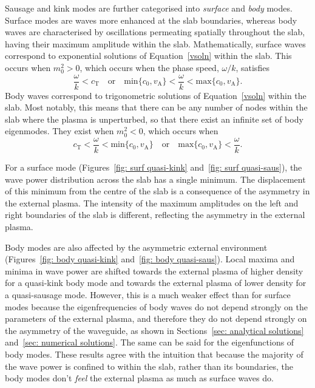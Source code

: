 Sausage and kink modes are further categorised into \textit{surface} and \textit{body} modes. Surface modes are waves more enhanced at the slab boundaries, whereas body waves are characterised by oscillations permeating spatially throughout the slab, having their maximum amplitude within the slab. Mathematically, surface waves correspond to exponential solutions of Equation~\eqref{vsoln} within the slab. This occurs when $m_0^2 > 0$, which occurs when the phase speed, $\omega/k$, satisfies
\begin{equation}
\frac{\omega}{k}<c_\textrm{T} \quad \text{or} \quad \text{min}\{c_0, v_\textrm{A}\}<\frac{\omega}{k}<\text{max}\{c_0, v_\textrm{A}\}.
\end{equation}
Body waves correspond to trigonometric solutions of Equation~\eqref{vsoln} within the slab. Most notably, this means that there can be any number of nodes within the slab where the plasma is unperturbed, so that there exist an infinite set of body eigenmodes. They exist when $m_0^2 < 0$, which occurs when
\begin{equation}
c_\textrm{T}<\frac{\omega}{k}<\text{min}\{c_0, v_\textrm{A}\} \quad \text{or} \quad \text{max}\{c_0, v_\textrm{A}\}<\frac{\omega}{k}. \label{bconditions}
\end{equation}

For a surface mode (Figures~\ref{fig: surf quasi-kink} and~\ref{fig: surf quasi-saus}), the wave power distribution across the slab has a single minimum. The displacement of this minimum from the centre of the slab is a consequence of the asymmetry in the external plasma. The intensity of the maximum amplitudes on the left and right boundaries of the slab is different, reflecting the asymmetry in the external plasma.

Body modes are also affected by the asymmetric external environment (Figures~\ref{fig: body quasi-kink} and~\ref{fig: body quasi-saus}). Local maxima and minima in wave power are shifted towards the external plasma of higher density for a quasi-kink body mode and towards the external plasma of lower density for a quasi-sausage mode. However, this is a much weaker effect than for surface modes because the eigenfrequencies of body waves do not depend strongly on the parameters of the external plasma, and therefore they do not depend strongly on the asymmetry of the waveguide, as shown in Sections~\ref{sec: analytical solutions} and~\ref{sec: numerical solutions}. The same can be said for the eigenfunctions of body modes. These results agree with the intuition that because the majority of the wave power is confined to within the slab, rather than its boundaries, the body modes don't \textit{feel} the external plasma as much as surface waves do.


